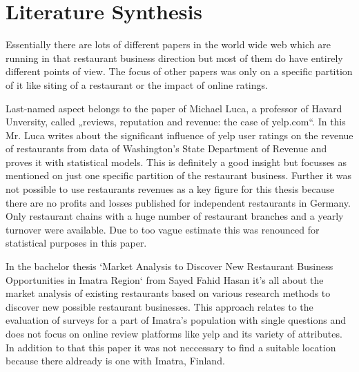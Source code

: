 \section{Literature Synthesis}
\label{sec:synthesis}
Essentially there are lots of different papers in the world wide web which are running in that restaurant business direction but most of them do have entirely different points of view. The focus of other papers was only on a specific partition of it like siting of a restaurant or the impact of online ratings. 

Last-named aspect belongs to the paper of Michael Luca, a professor of Havard Unversity, called „reviews, reputation and revenue: the case of yelp.com“. In this Mr. Luca writes about the significant influence of yelp user ratings on the revenue of restaurants from data of Washington’s State Department of Revenue and proves it with statistical models. This is definitely a good insight but focusses as mentioned on just one specific partition of the restaurant business. Further it was not possible to use restaurants revenues as a key figure for this thesis because there are no profits and losses published for independent restaurants in Germany. Only restaurant chains with a huge number of restaurant branches and a yearly turnover were available. Due to too vague estimate this was renounced for statistical purposes in this paper.

In the bachelor thesis `Market   Analysis   to   Discover   New   Restaurant Business Opportunities in Imatra Region` from Sayed Fahid Hasan it's all about the market analysis of existing restaurants based on various research methods to discover new possible restaurant businesses. This approach relates to the evaluation of surveys for a part of Imatra's population with single questions and does not focus on online review platforms like yelp and its variety of attributes. In addition to that this paper it was not neccessary to find a suitable location because there aldready is one with Imatra, Finland.